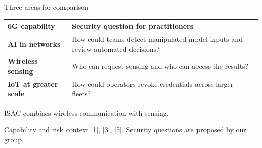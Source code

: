 \documentclass[aspectratio=169,11pt]{beamer}
\newcommand{\source}[1]{\par\vfill{\footnotesize\color{Muted}#1}\par\vspace{.18cm}}
\begin{document}
\begin{frame}[t]{Three areas for comparison}
\vspace{.38cm}
\renewcommand{\arraystretch}{1.36}
\begin{tabularx}{\textwidth}{@{}>{\raggedright\arraybackslash}p{3.62cm}Y@{}}
\toprule
\textbf{6G capability} & \textbf{Security question for practitioners}\\
\midrule
\textbf{AI in networks} & How could teams detect manipulated model inputs and review automated decisions?\\
\textbf{Wireless sensing} & Who can request sensing and who can access the results?\\
\textbf{IoT at greater scale} & How could operators revoke credentials across larger fleets?\\
\bottomrule
\end{tabularx}
\vspace{.18cm}

{\footnotesize\color{Muted}ISAC combines wireless communication with sensing.}
\source{Capability and risk context [1], [3], [5]. Security questions are proposed by our group.}
\end{frame}
\end{document}
